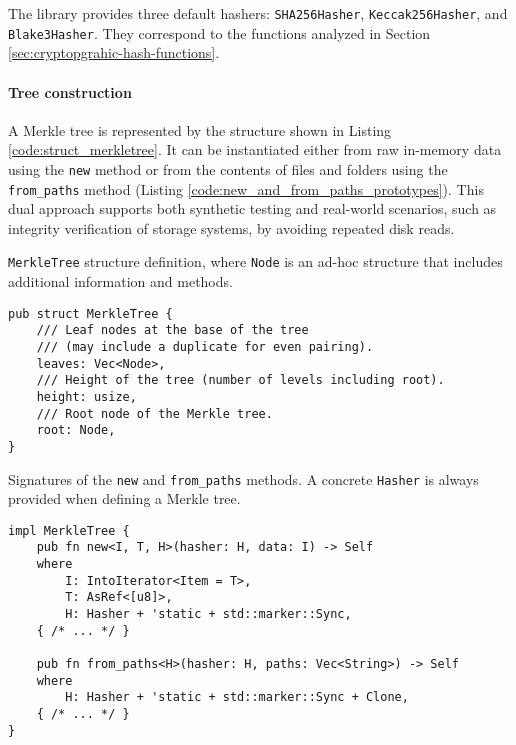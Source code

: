 The library provides three default hashers: \texttt{SHA256Hasher}, \texttt{Keccak256Hasher}, and \texttt{Blake3Hasher}. They correspond to the functions analyzed in Section \ref{sec:cryptopgrahic-hash-functions}. 

\paragraph{Tree construction}
A Merkle tree is represented by the structure shown in Listing \ref{code:struct_merkletree}. It can be instantiated either from raw in-memory data using the \texttt{new} method or from the contents of files and folders using the \texttt{from\_paths} method (Listing \ref{code:new_and_from_paths_prototypes}). This dual approach supports both synthetic testing and real-world scenarios, such as integrity verification of storage systems, by avoiding repeated disk reads.

\begin{listing}[!ht]
\caption{\texttt{MerkleTree} structure definition, where \texttt{Node} is an ad-hoc structure that includes additional information and methods.}
\label{code:struct_merkletree}
\begin{verbatim}
pub struct MerkleTree {
    /// Leaf nodes at the base of the tree 
    /// (may include a duplicate for even pairing).
    leaves: Vec<Node>,
    /// Height of the tree (number of levels including root).
    height: usize,
    /// Root node of the Merkle tree.
    root: Node,
}
\end{verbatim}
\end{listing}


\begin{listing}[H]
\caption{Signatures of the \texttt{new} and \texttt{from\_paths} methods. A concrete \texttt{Hasher} is always provided when defining a Merkle tree.}
\label{code:new_and_from_paths_prototypes}
\begin{verbatim}
impl MerkleTree {
    pub fn new<I, T, H>(hasher: H, data: I) -> Self
    where
        I: IntoIterator<Item = T>,
        T: AsRef<[u8]>,
        H: Hasher + 'static + std::marker::Sync,
    { /* ... */ }

    pub fn from_paths<H>(hasher: H, paths: Vec<String>) -> Self
    where
        H: Hasher + 'static + std::marker::Sync + Clone,
    { /* ... */ }
}
\end{verbatim}
\end{listing}

